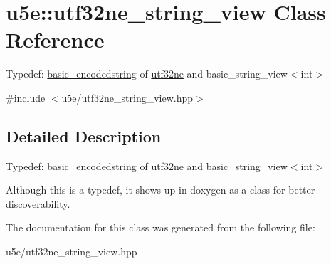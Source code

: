 \hypertarget{classu5e_1_1utf32ne__string__view}{}\section{u5e\+:\+:utf32ne\+\_\+string\+\_\+view Class Reference}
\label{classu5e_1_1utf32ne__string__view}


Typedef\+: \hyperlink{classu5e_1_1basic__encodedstring}{basic\+\_\+encodedstring} of \hyperlink{classu5e_1_1utf32ne}{utf32ne} and basic\+\_\+string\+\_\+view$<$int$>$  




{\ttfamily \#include $<$u5e/utf32ne\+\_\+string\+\_\+view.\+hpp$>$}



\subsection{Detailed Description}
Typedef\+: \hyperlink{classu5e_1_1basic__encodedstring}{basic\+\_\+encodedstring} of \hyperlink{classu5e_1_1utf32ne}{utf32ne} and basic\+\_\+string\+\_\+view$<$int$>$ 

Although this is a typedef, it shows up in doxygen as a class for better discoverability. 

The documentation for this class was generated from the following file\+:\begin{DoxyCompactItemize}
\item 
u5e/utf32ne\+\_\+string\+\_\+view.\+hpp\end{DoxyCompactItemize}
